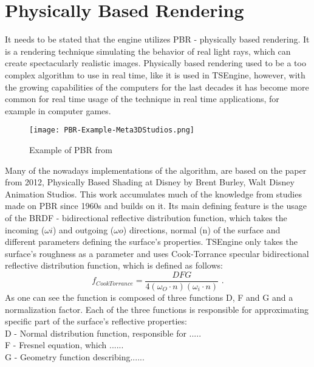 \newpage
\section{Physically Based Rendering}
It needs to be stated that the engine utilizes PBR - physically based rendering. It is a rendering technique simulating the behavior of real light rays, which can create spectacularly realistic images. Physically based rendering used to be a too complex algorithm to use in real time, like it is used in TSEngine, however, with the growing capabilities of the computers for the last decades it has become more common for real time usage of the technique in real time applications, for example in computer games.

\begin{figure}[h]
    \texttt{[image: PBR-Example-Meta3DStudios.png]}
    \caption{Example of PBR from }
\end{figure}
Many of the nowadays implementations of the algorithm, are based on the paper from 2012, Physically Based Shading at Disney by Brent Burley, Walt Disney Animation Studios. This work accumulates much of the knowledge from studies made on PBR since 1960s and builds on it. Its main defining feature is the usage of the BRDF - bidirectional reflective distribution function, which takes the incoming ($\omega i$) and outgoing ($\omega o$) directions, normal (n) of the surface and different parameters defining the surface's properties. TSEngine only takes the surface's roughness as a parameter and uses Cook-Torrance specular bidirectional reflective distribution function, which is defined as follows:
\begin{equation}
f_{CookTorrance}=\frac{DFG}{4(\omega_{O} \cdot n)(\omega_{i} \cdot n)}
\text{ .}
\label{EquationCookTorrance}
\end{equation}
As one can see the function is composed of three functions D, F and G and a normalization factor. Each of the three functions is responsible for approximating specific part of the surface's reflective properties:\\
D - Normal distribution function, responsible for ..... \\
F - Fresnel equation, which ......\\
G - Geometry function describing......

